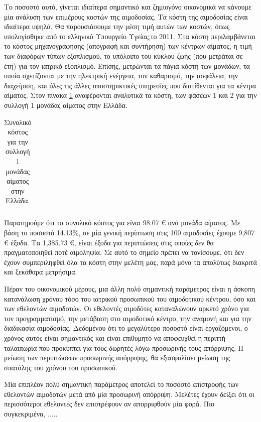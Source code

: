 		Το ποσοστό αυτό, γίνεται ιδιαίτερα σημαντικό και ζημιογόνο οικονομικά να κάνουμε μία ανάλυση των επιμέρους κοστών της αιμοδοσίας. Τα κόστη της αιμοδοσίας είναι ιδιαίτερα υψηλά. Θα παρουσιάσουμε την μέση τιμή αυτών των κοστών, όπως υπολογίσθηκε από το ελληνικό Υπουργείο Υγείας,το 2011.\cite{Fragoulakis} Στα κόστη περιλαμβάνεται το κόστος μηχανογράφησης (απογραφή και συντήρηση) των κέντρων αίματος, η τιμή των διαφόρων τύπων εξοπλισμού, το υπόλοιπο του κύκλου ζωής (που μετράται σε έτη) για τον ιατρικό εξοπλισμό. Επίσης, μετρώνται τα πάγια κόστη των μονάδων, τα οποία σχετίζονται με την ηλεκτρική ενέργεια,  τον καθαρισμό, την ασφάλεια, την διαχείριση, και όλες τις άλλες υποστηρικτικές υπηρεσίες που διατίθενται για τα κέντρα αίματος. Στον πίνακα \ref{tab:costs} αναφέρονται αναλυτικά τα κόστη, των φάσεων 1 και 2 για την συλλογή 1 μονάδας αίματος στην Ελλάδα.
		
		
		\begin{table}[H]
	\centering
	\begin{tabular}{l|}

	\end{tabular}
	\caption{Συνολικό κόστος για την συλλογή 1 μονάδας αίματος στην Ελλάδα.}
	\label{tab:costs}
\end{table}
		
		Παρατηρούμε ότι το συνολικό κόστος για είναι 98.07 € ανά μονάδα αίματος.  Με βάση το ποσοστό 14.13\%, σε μία γενική περίπτωση στις 100 αιμοδοσίες έχουμε 9,807 € έξοδα. Τα 1,385.73 €, είναι έξοδα για περιπτώσεις στις οποίες δεν θα πραγματοποιηθεί ποτέ αιμοληψία. Σε αυτό το σημείο πρέπει να τονίσουμε, ότι δεν έχουν συμπεριληφθεί όλα τα κόστη στην μελέτη μας, παρά μόνο τα απολύτως διακριτά και ξεκάθαρα μετρήσιμα.
	
		Πέραν του οικονομικού μέρους, μια άλλη πολύ σημαντική παράμετρος είναι η άσκοπη κατανάλωση χρόνου τόσο του ιατρικού προσωπικού του αιμοδοτικού κέντρου, όσο και των εθελοντών αιμοδοτών. Οι εθελοντές αιμοδότες καταναλώνουν αρκετό χρόνο για τον προγραμματισμό, την μετάβαση στο αιμοδοτικό κέντρο, την αναμονή και για την διαδικασία αιμοδοσίας.  Δεδομένου ότι το μεγαλύτερο ποσοστό είναι εργαζόμενοι, ο χρόνος αυτός είναι σημαντικός και είναι επιθυμητό να αποφευχθεί η περιττή ταλαιπωρία που προκύπτει για τους δωρητές λόγω προσωρινής τους απόρριψης. Η μείωση των περιπτώσεων προσωρινής απόρριψης, θα εξασφαλίσει μείωση της σπατάλης του χρόνου του προσωπικού.
		
		Μία επιπλέον πολύ σημαντική παράμετρος αποτελεί το ποσοστό επιστροφής των εθελοντών αιμοδοτών μετά από μία προσωρινή απόρριψη. Μελέτες έχουν δείξει ότι οι περισσότεροι εθελοντές δεν επιστρέφουν αν απορριφθούν μία φορά. Πιο συγκεκριμένα, ..... %
	
